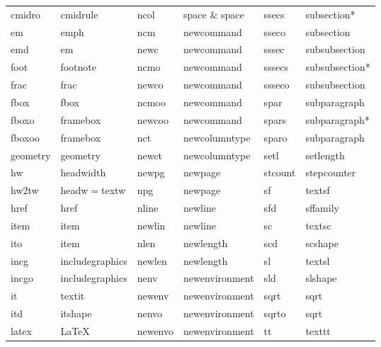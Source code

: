 \documentclass[11pt,french]{article}
\begin{document}
\begin{table}[H]
{\begin{tabular}{llllll}
cmidro           & cmidrule          & ncol       & space \& space & ssecs           & subsection* \\
em               & emph              & ncm        & newcommand     & sseco           & subsection \\ 
emd              & em                & newc       & newcommand     & sssec           & subsubsection \\
foot             & footnote          & ncmo       & newcommand     & sssecs          & subsubsection* \\
frac             & frac              & newco      & newcommand     & ssseco          & subsubsection \\
fbox             & fbox              & ncmoo      & newcommand     & spar            & subparagraph \\
fboxo            & framebox          & newcoo     & newcommand     & spars           & subparagraph* \\
fboxoo           & framebox          & nct        & newcolumntype  & sparo           & subparagraph \\
geometry         & geometry          & newct      & newcolumntype  & setl            & setlength \\
hw               & headwidth         & newpg      & newpage        & stcount         & stepcounter \\
hw2tw            & headw\(=\)textw   & npg        & newpage        & sf              & textsf \\
href             & href              & nline      & newline        & sfd             & sffamily \\
item             & item              & newlin     & newline        & sc              & textsc \\
ito              & item              & nlen       & newlength      & scd             & scshape \\
incg             & includegraphics   & newlen     & newlength      & sl              & textsl \\
incgo            & includegraphics   & nenv       & newenvironment & sld             & slshape \\
it               & textit            & newenv     & newenvironment & sqrt            & sqrt \\
itd              & itshape           & nenvo      & newenvironment & sqrto           & sqrt \\
latex            & LaTeX             & newenvo    & newenvironment & tt              & texttt \\

\end{tabular}}
\end{table}
\end{document}
